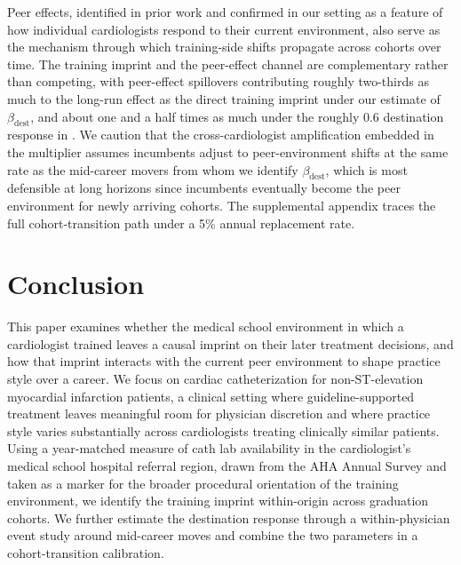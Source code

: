 \documentclass[12pt]{article}
\let\textcite\citet
\begin{document}
Peer effects, identified in prior work and confirmed in our setting as a feature of how individual cardiologists respond to their current environment, also serve as the mechanism through which training-side shifts propagate across cohorts over time. The training imprint and the peer-effect channel are complementary rather than competing, with peer-effect spillovers contributing roughly two-thirds as much to the long-run effect as the direct training imprint under our estimate of $\beta_{\text{dest}}$, and about one and a half times as much under the roughly 0.6 destination response in \textcite{molitor2018}. We caution that the cross-cardiologist amplification embedded in the multiplier assumes incumbents adjust to peer-environment shifts at the same rate as the mid-career movers from whom we identify $\beta_{\text{dest}}$, which is most defensible at long horizons since incumbents eventually become the peer environment for newly arriving cohorts. The supplemental appendix traces the full cohort-transition path under a 5\% annual replacement rate.


\section{Conclusion}\label{sec:conclusion}

This paper examines whether the medical school environment in which a cardiologist trained leaves a causal imprint on their later treatment decisions, and how that imprint interacts with the current peer environment to shape practice style over a career. We focus on cardiac catheterization for non-ST-elevation myocardial infarction patients, a clinical setting where guideline-supported treatment leaves meaningful room for physician discretion and where practice style varies substantially across cardiologists treating clinically similar patients. Using a year-matched measure of cath lab availability in the cardiologist's medical school hospital referral region, drawn from the AHA Annual Survey and taken as a marker for the broader procedural orientation of the training environment, we identify the training imprint within-origin across graduation cohorts. We further estimate the destination response through a within-physician event study around mid-career moves and combine the two parameters in a cohort-transition calibration.
\end{document}
